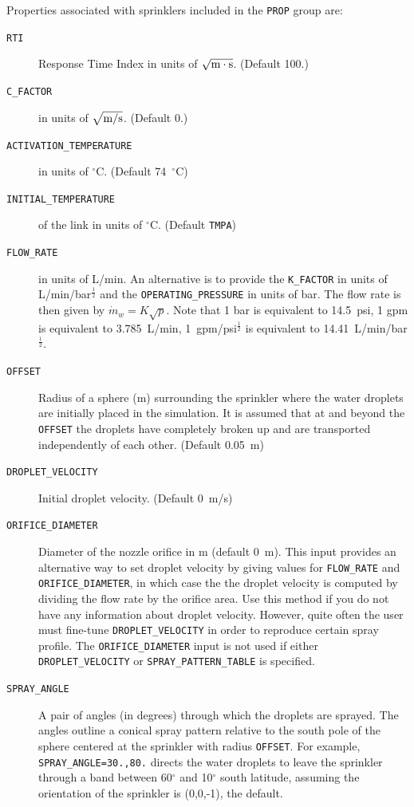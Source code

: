 \documentclass[11pt]{book}
\newcommand{\ct}{\tt\small}
\newcommand{\dm}{\dot{m}}
\newcommand{\ha}{\frac{1}{2}}
\begin{document}
Properties associated with sprinklers included in the {\ct PROP} group are:
\begin{description}
\item[{\ct RTI}] Response Time Index in units of $\sqrt{\hbox{m}\cdot \hbox{s}}$. (Default 100.)
\item[{\ct C\_FACTOR}] in units of $\sqrt{\hbox{m/s}}$. (Default 0.)
\item[{\ct ACTIVATION\_TEMPERATURE}] in units of $^\circ$C. (Default 74~$^\circ$C)
\item[{\ct INITIAL\_TEMPERATURE}] of the link in units of $^\circ$C. (Default {\ct TMPA})
\item[{\ct FLOW\_RATE}] in units of L/min.
An alternative is to provide the {\ct K\_FACTOR} in units of L/min/bar$^\ha$ and the
{\ct OPERATING\_PRESSURE} in units of bar.
The flow rate is then given by $ \dm_w = K \sqrt{p}$. Note that 1 bar is equivalent to
14.5~psi, 1 gpm is equivalent to 3.785~L/min, 1~gpm/psi$^\ha$ is
equivalent to 14.41~L/min/bar$^\ha$.
\item[{\ct OFFSET}] Radius of a sphere (m) surrounding the
sprinkler where the water droplets are initially placed in the simulation. It is assumed that
at and beyond the {\ct OFFSET} the droplets have completely broken
up and are transported independently of each other. (Default 0.05~m)
\item[{\ct DROPLET\_VELOCITY}]  Initial droplet velocity. (Default 0~m/s)
\item[{\ct ORIFICE\_DIAMETER}] Diameter of the nozzle orifice in m (default 0~m). This input provides an alternative way to set droplet velocity
by giving values for {\ct FLOW\_RATE} and {\ct ORIFICE\_DIAMETER}, in which case the the droplet velocity is computed by dividing the
flow rate by the orifice area. Use this method if you do not have any information about droplet velocity. However, quite often
the user must fine-tune {\ct DROPLET\_VELOCITY} in order to reproduce certain spray profile.
The {\ct ORIFICE\_DIAMETER} input is not used if either {\ct DROPLET\_VELOCITY} or {\ct SPRAY\_PATTERN\_TABLE} is specified.
\item[{\ct SPRAY\_ANGLE}] A pair of angles (in degrees) through which the droplets are sprayed.
The angles outline a conical spray pattern relative to the
south pole of the sphere centered at the sprinkler with radius {\ct OFFSET}.
For example, {\ct SPRAY\_ANGLE=30.,80.} directs the water droplets to leave
the sprinkler through a band between 60$^\circ$ and 10$^\circ$ south latitude, assuming the orientation of
the sprinkler is (0,0,-1), the default.

\end{description}
\end{document}
